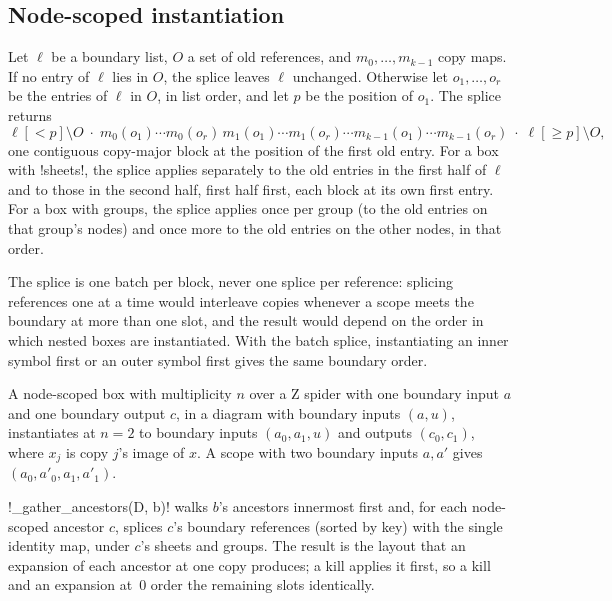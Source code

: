 \subsection{Node-scoped instantiation}

\begin{definition}\label{def:diagrams-splice}
Let $\ell$ be a boundary list, $O$ a set of old references, and $m_0,\dots,m_{k-1}$ copy maps. If no entry of $\ell$ lies in $O$, the splice leaves $\ell$ unchanged. Otherwise let $o_1,\dots,o_r$ be the entries of $\ell$ in $O$, in list order, and let $p$ be the position of $o_1$. The splice returns
\[
\ell[{<}p]\setminus O \;\cdot\; m_0(o_1)\cdots m_0(o_r)\,m_1(o_1)\cdots m_1(o_r)\cdots m_{k-1}(o_1)\cdots m_{k-1}(o_r) \;\cdot\; \ell[{\ge}p]\setminus O,
\]
one contiguous copy-major block at the position of the first old entry. For a box with \py!sheets!, the splice applies separately to the old entries in the first half of $\ell$ and to those in the second half, first half first, each block at its own first entry. For a box with groups, the splice applies once per group (to the old entries on that group's nodes) and once more to the old entries on the other nodes, in that order.
\end{definition}

The splice is one batch per block, never one splice per reference: splicing references one at a time would interleave copies whenever a scope meets the boundary at more than one slot, and the result would depend on the order in which nested boxes are instantiated. With the batch splice, instantiating an inner symbol first or an outer symbol first gives the same boundary order.

\begin{example}
A node-scoped box with multiplicity $n$ over a Z spider with one boundary input $a$ and one boundary output $c$, in a diagram with boundary inputs $(a, u)$, instantiates at $n=2$ to boundary inputs $(a_0, a_1, u)$ and outputs $(c_0, c_1)$, where $x_j$ is copy $j$'s image of $x$. A scope with two boundary inputs $a, a'$ gives $(a_0, a'_0, a_1, a'_1)$.
\end{example}

\begin{definition}\label{def:diagrams-gather}
\py!_gather_ancestors(D, b)! walks $b$'s ancestors innermost first and, for each node-scoped ancestor $c$, splices $c$'s boundary references (sorted by key) with the single identity map, under $c$'s sheets and groups. The result is the layout that an expansion of each ancestor at one copy produces; a kill applies it first, so a kill and an expansion at~$0$ order the remaining slots identically.
\end{definition}

